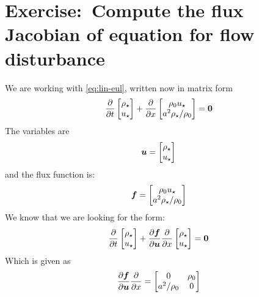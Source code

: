 \documentclass[justified, nobib,a4paper]{tufte-handout}
\newcommand{\Q}[1]{\section{Exercise:~{#1}}}
\begin{document}
\Q{Compute the flux Jacobian of equation for flow disturbance}
We are working with \cref{eq:lin-eul}, written now in matrix form
\[
	\pdv{}{t}
	\begin{bmatrix}
		\rho_\star \\ u_\star
	\end{bmatrix}
	+ \pdv{}{x} \begin{bmatrix}
		\rho_0 u_\star \\ a^2 \rho_\star / \rho_0
	\end{bmatrix} = \bm{0}
\]
The variables are
\[
	\bm{u} = \begin{bmatrix}
		\rho_\star \\ u_\star
	\end{bmatrix}
\]
and the flux function is:
\[
	\bm{f} = \begin{bmatrix}
		\rho_0 u_\star \\ a^2 \rho_\star / \rho_0
	\end{bmatrix}
\]
We know that we are looking for the form:
\[
	\pdv{}{t}
	\begin{bmatrix}
		\rho_\star \\ u_\star
	\end{bmatrix}
	+ \pdv{\bm{f}}{\bm{u}}\pdv{}{x} \begin{bmatrix}
		\rho_\star \\ u_\star
	\end{bmatrix} = \bm{0}
\]
Which is given as
\[
	\pdv{\bm{f}}{\bm{u}}\pdv{}{x} = \begin{bmatrix}
		0         & \rho_0 \\
		a^2 / \rho_0 & 0
	\end{bmatrix}
\]
\end{document}
